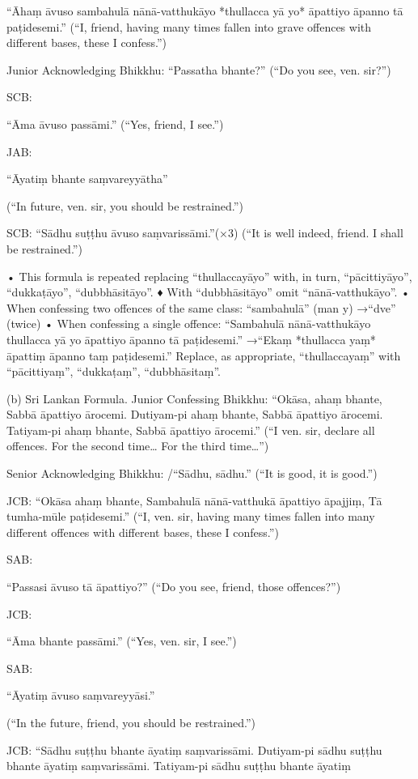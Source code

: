 “Āhaṃ āvuso sambahulā nānā-vatthukāyo
*thullacca yā yo* āpattiyo āpanno tā paṭidesemi.”
(“I, friend, having many times fallen into grave
offences with different bases, these I confess.”)

Junior Acknowledging Bhikkhu:
“Passatha bhante?”
(“Do you see, ven. sir?”)

SCB:

“Āma āvuso passāmi.”
(“Yes, friend, I see.”)

JAB:

“Āyatiṃ bhante saṃvareyyātha”

(“In future, ven. sir, you should be restrained.”)

SCB: “Sādhu suṭṭhu āvuso saṃvarissāmi.”(×3)
(“It is well indeed, friend. I shall be restrained.”)

• This formula is repeated replacing
“thullaccayāyo” with, in turn, “pācittiyāyo”,
“dukkaṭāyo”, “dubbhāsitāyo”.
♦ With “dubbhāsitāyo” omit “nānā-vatthukāyo”.
• When confessing two offences of the same class:
“sambahulā” (man y) →“dve” (twice)
• When confessing a single offence:
“Sambahulā nānā-vatthukāyo thullacca yā yo
āpattiyo āpanno tā paṭidesemi.”
→“Ekaṃ *thullacca yaṃ* āpattiṃ āpanno taṃ
paṭidesemi.”
Replace, as appropriate, “thullaccayaṃ” with
“pācittiyaṃ”, “dukkaṭaṃ”, “dubbhāsitaṃ”.

(b) Sri Lankan Formula.
Junior Confessing Bhikkhu:
“Okāsa, ahaṃ bhante,
Sabbā āpattiyo ārocemi.
Dutiyam-pi ahaṃ bhante,
Sabbā āpattiyo ārocemi.
Tatiyam-pi ahaṃ bhante,
Sabbā āpattiyo ārocemi.”
(“I ven. sir, declare all offences. For the second
time… For the third time…”)

Senior Acknowledging Bhikkhu:
/“Sādhu, sādhu.”
(“It is good, it is good.”)

JCB:
“Okāsa ahaṃ bhante,
Sambahulā nānā-vatthukā āpattiyo āpajjiṃ,
Tā tumha-mūle paṭidesemi.”
(“I, ven. sir, having many times fallen into many
different offences with different bases, these I confess.”)

SAB:

“Passasi āvuso tā āpattiyo?”
(“Do you see, friend, those offences?”)

JCB:

“Āma bhante passāmi.”
(“Yes, ven. sir, I see.”)

SAB:

“Āyatiṃ āvuso saṃvareyyāsi.”

(“In the future, friend, you should be restrained.”)

JCB: “Sādhu suṭṭhu bhante āyatiṃ saṃvarissāmi.
Dutiyam-pi sādhu suṭṭhu bhante āyatiṃ
saṃvarissāmi.
Tatiyam-pi sādhu suṭṭhu bhante āyatiṃ

